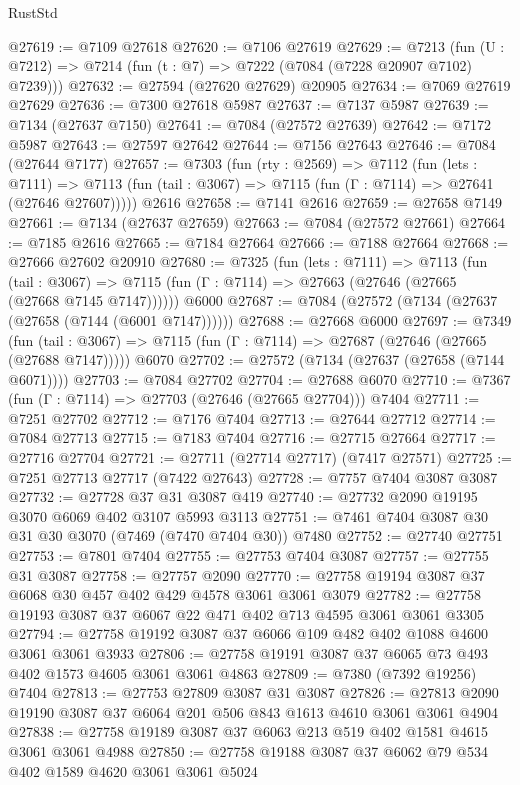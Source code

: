 \begin{lexlean}{RustStd}
\begin{coremodule}
@27619 := @7109 @27618
@27620 := @7106 @27619
@27629 := @7213
    (fun (U : @7212) => @7214 (fun (t : @7) => @7222 (@7084 (@7228 @20907 @7102) @7239)))
@27632 := @27594 (@27620 @27629) @20905
@27634 := @7069 @27619 @27629
@27636 := @7300 @27618 @5987
@27637 := @7137 @5987
@27639 := @7134 (@27637 @7150)
@27641 := @7084 (@27572 @27639)
@27642 := @7172 @5987
@27643 := @27597 @27642
@27644 := @7156 @27643
@27646 := @7084 (@27644 @7177)
@27657 := @7303
    (fun (rty : @2569) =>
    @7112
      (fun (lets : @7111) =>
      @7113 (fun (tail : @3067) => @7115 (fun (Γ : @7114) => @27641 (@27646 @27607)))))
    @2616
@27658 := @7141 @2616
@27659 := @27658 @7149
@27661 := @7134 (@27637 @27659)
@27663 := @7084 (@27572 @27661)
@27664 := @7185 @2616
@27665 := @7184 @27664
@27666 := @7188 @27664
@27668 := @27666 @27602 @20910
@27680 := @7325
    (fun (lets : @7111) =>
    @7113
      (fun (tail : @3067) =>
      @7115 (fun (Γ : @7114) => @27663 (@27646 (@27665 (@27668 @7145 @7147))))))
    @6000
@27687 := @7084 (@27572 (@7134 (@27637 (@27658 (@7144 (@6001 @7147))))))
@27688 := @27668 @6000
@27697 := @7349
    (fun (tail : @3067) => @7115 (fun (Γ : @7114) => @27687 (@27646 (@27665 (@27688 @7147)))))
    @6070
@27702 := @27572 (@7134 (@27637 (@27658 (@7144 @6071))))
@27703 := @7084 @27702
@27704 := @27688 @6070
@27710 := @7367 (fun (Γ : @7114) => @27703 (@27646 (@27665 @27704))) @7404
@27711 := @7251 @27702
@27712 := @7176 @7404
@27713 := @27644 @27712
@27714 := @7084 @27713
@27715 := @7183 @7404
@27716 := @27715 @27664
@27717 := @27716 @27704
@27721 := @27711 (@27714 @27717) (@7417 @27571)
@27725 := @7251 @27713 @27717 (@7422 @27643)
@27728 := @7757 @7404 @3087 @3087
@27732 := @27728 @37 @31 @3087 @419
@27740 := @27732 @2090 @19195 @3070 @6069 @402 @3107 @5993 @3113
@27751 := @7461 @7404 @3087 @30 @31 @30 @3070 (@7469 (@7470 @7404 @30)) @7480
@27752 := @27740 @27751
@27753 := @7801 @7404
@27755 := @27753 @7404 @3087
@27757 := @27755 @31 @3087
@27758 := @27757 @2090
@27770 := @27758 @19194 @3087 @37 @6068 @30 @457 @402 @429 @4578 @3061 @3061 @3079
@27782 := @27758 @19193 @3087 @37 @6067 @22 @471 @402 @713 @4595 @3061 @3061 @3305
@27794 := @27758 @19192 @3087 @37 @6066 @109 @482 @402 @1088 @4600 @3061 @3061 @3933
@27806 := @27758 @19191 @3087 @37 @6065 @73 @493 @402 @1573 @4605 @3061 @3061 @4863
@27809 := @7380 (@7392 @19256) @7404
@27813 := @27753 @27809 @3087 @31 @3087
@27826 := @27813 @2090 @19190 @3087 @37 @6064 @201 @506 @843 @1613 @4610 @3061 @3061 @4904
@27838 := @27758 @19189 @3087 @37 @6063 @213 @519 @402 @1581 @4615 @3061 @3061 @4988
@27850 := @27758 @19188 @3087 @37 @6062 @79 @534 @402 @1589 @4620 @3061 @3061 @5024

\end{coremodule}
\end{lexlean}
